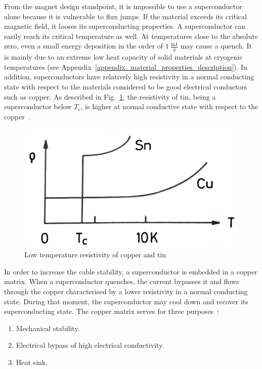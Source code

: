 From the magnet design standpoint, it is impossible to use a superconductor alone because it is vulnerable to flux jumps. If the material exceeds its critical magnetic field, it looses its superconducting properties. A superconductor can easily reach its critical temperature as well. At temperatures close to the absolute zero, even a small energy deposition in the order of $1~\frac{\text{mJ}}{g}$ may cause a quench. It is mainly due to an extreme low heat capacity of solid materials at cryogenic temperatures (see Appendix~\ref{appendix_material_properties_description}). In addition, superconductors have relatively high resistivity in a normal conducting state with respect to the materials considered to be good electrical conductors such as copper. As described in Fig.~\ref{fig:resitivity_tin_copper}, the resistivity of tin, being a superconductor below $T_\text{c}$, is higher at normal conductive state with respect to the copper~\cite[p.~1-6]{superconducting_accelerator_magnets}.

\begin{figure}[H]
    \centering
    \includegraphics[width=0.35\linewidth]{sections/introduction/figures/sn_cu_resistivity.png}
    \caption{Low temperature resistivity of copper and tin~\cite{superconducting_accelerator_magnets}}
    \label{fig:resitivity_tin_copper}
\end{figure} 

In order to increase the cable stability, a superconductor is embedded in a copper matrix. When a superconductor quenches, the current bypasses it and flows through the copper characterised by a lower resistivity in a normal conducting state. During that moment, the superconductor may cool down and recover its superconducting state. The copper matrix serves for three purposes~\cite[p.~31-33]{superconducting_accelerator_magnets}: 

\begin{enumerate}
    \item Mechanical stability.
    \item Electrical bypass of high electrical conductivity.
    \item Heat sink.
\end{enumerate}

